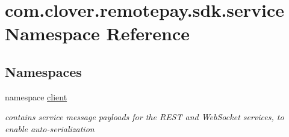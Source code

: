 \hypertarget{namespacecom_1_1clover_1_1remotepay_1_1sdk_1_1service}{}\section{com.\+clover.\+remotepay.\+sdk.\+service Namespace Reference}
\label{namespacecom_1_1clover_1_1remotepay_1_1sdk_1_1service}
\subsection*{Namespaces}
\begin{DoxyCompactItemize}
\item 
namespace \hyperlink{namespacecom_1_1clover_1_1remotepay_1_1sdk_1_1service_1_1client}{client}
\begin{DoxyCompactList}\small\item\em contains service message payloads for the R\+E\+ST and Web\+Socket services, to enable auto-\/serialization \end{DoxyCompactList}\end{DoxyCompactItemize}
